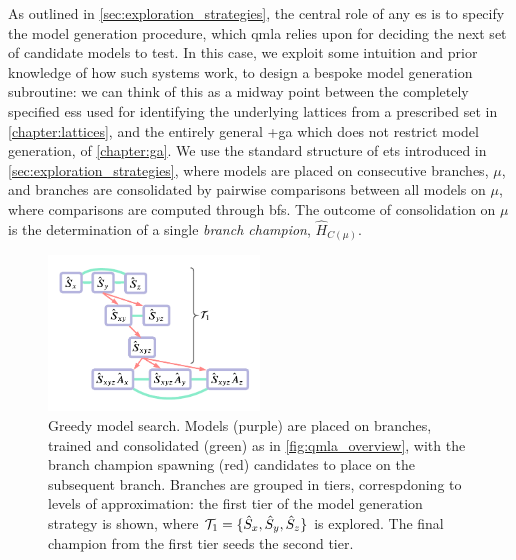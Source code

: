 As outlined in \cref{sec:exploration_strategies}, the central role of any \gls{es} is to specify the 
    model generation procedure, which \gls{qmla} relies upon for deciding the next set of candidate models to test. 
In this case, we exploit some intuition and prior knowledge of how such systems work, 
    to design a bespoke model generation subroutine:
    we can think of this as a midway point between the completely specified \glspl{es} used 
    for identifying the underlying lattices from a prescribed set in \cref{chapter:lattices}, 
    and the entirely general \glsxtrlong+{ga} which does not restrict model generation, of \cref{chapter:ga}.
We use the standard structure of \glspl{et} introduced in \cref{sec:exploration_strategies}, 
    where models are placed on consecutive branches, $\mu$, and branches are consolidated by pairwise comparisons between all models on $\mu$, 
    where comparisons are computed through \glspl{bf}.
The outcome of consolidation on $\mu$ is the determination of a single \emph{branch champion}, $\hat{H}_{C(\mu)}$. 
\par 


\begin{figure}
    \begin{center}
        \includegraphics[width=0.5\textwidth]{experimental_study/figures/greedy_search.pdf}
    \end{center}
    \caption[Greedy model search]{
        Greedy \gls{model search}. 
        Models (purple) are placed on branches, trained and consolidated (green) as in \cref{fig:qmla_overview}, 
            with the branch champion spawning (red) candidates to place on the subsequent branch.  
        Branches are grouped in tiers, correspdoning to levels of approximation:
            the first tier of the model generation strategy is shown, 
            where $\mathcal{T}_1 = \{ \hat{S}_x, \hat{S}_y, \hat{S}_z\}$ is explored. 
        The final champion from the first tier seeds the second tier. 
    }
    \label{fig:greedy_search}
\end{figure}


